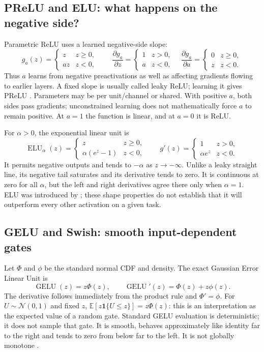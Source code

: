 \subsection{PReLU and ELU: what happens on the negative side?}
Parametric ReLU uses a learned negative-side slope:
\[
 g_a(z)=\begin{cases}z&z\geq0,\\az&z<0,\end{cases}\qquad
 \frac{\partial g_a}{\partial z}=\begin{cases}1&z>0,\\a&z<0,\end{cases}
 \quad
 \frac{\partial g_a}{\partial a}=\begin{cases}0&z\geq0,\\z&z<0.\end{cases}
\]
Thus $a$ learns from negative preactivations as well as affecting gradients flowing to earlier layers. A fixed slope is usually called leaky ReLU; learning it gives PReLU \citep{he2015prelu}. Parameters may be per unit/channel or shared. With positive $a$, both sides pass gradients; unconstrained learning does not mathematically force $a$ to remain positive. At $a=1$ the function is linear, and at $a=0$ it is ReLU.

For $\alpha>0$, the exponential linear unit is
\[
 \operatorname{ELU}_\alpha(z)=\begin{cases}z&z\geq0,\\\alpha(e^z-1)&z<0,\end{cases}\qquad
 g'(z)=\begin{cases}1&z>0,\\\alpha e^z&z<0.\end{cases}
\]
It permits negative outputs and tends to $-\alpha$ as $z\to-\infty$. Unlike a leaky straight line, its negative tail saturates and its derivative tends to zero. It is continuous at zero for all $\alpha$, but the left and right derivatives agree there only when $\alpha=1$. ELU was introduced by \citet{clevert2015elu}; these shape properties do not establish that it will outperform every other activation on a given task.

\subsection{GELU and Swish: smooth input-dependent gates}
Let $\Phi$ and $\phi$ be the standard normal CDF and density. The exact Gaussian Error Linear Unit is
\[
 \operatorname{GELU}(z)=z\Phi(z),\qquad
 \operatorname{GELU}'(z)=\Phi(z)+z\phi(z).
\]
The derivative follows immediately from the product rule and $\Phi'=\phi$. For $U\sim\mathcal{N}(0,1)$ and fixed $z$, $\mathbb{E}[z\mathbf1\{U\leq z\}]=z\Phi(z)$: this is an interpretation as the expected value of a random gate. Standard GELU evaluation is deterministic; it does not sample that gate. It is smooth, behaves approximately like identity far to the right and tends to zero from below far to the left. It is not globally monotone \citep{hendrycks2016gelu}.

